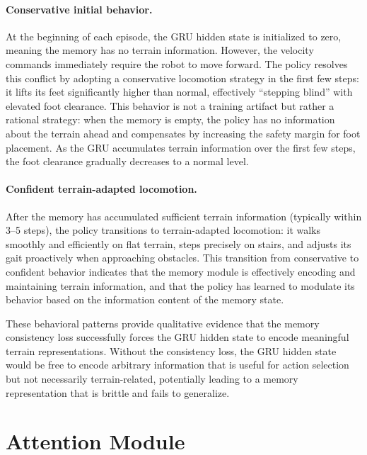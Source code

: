 \paragraph{Conservative initial behavior.}
At the beginning of each episode, the GRU hidden state is initialized to zero, meaning the memory has no terrain information. However, the velocity commands immediately require the robot to move forward. The policy resolves this conflict by adopting a conservative locomotion strategy in the first few steps: it lifts its feet significantly higher than normal, effectively ``stepping blind'' with elevated foot clearance. This behavior is not a training artifact but rather a rational strategy: when the memory is empty, the policy has no information about the terrain ahead and compensates by increasing the safety margin for foot placement. As the GRU accumulates terrain information over the first few steps, the foot clearance gradually decreases to a normal level.

\paragraph{Confident terrain-adapted locomotion.}
After the memory has accumulated sufficient terrain information (typically within 3--5 steps), the policy transitions to terrain-adapted locomotion: it walks smoothly and efficiently on flat terrain, steps precisely on stairs, and adjusts its gait proactively when approaching obstacles. This transition from conservative to confident behavior indicates that the memory module is effectively encoding and maintaining terrain information, and that the policy has learned to modulate its behavior based on the information content of the memory state.

These behavioral patterns provide qualitative evidence that the memory consistency loss successfully forces the GRU hidden state to encode meaningful terrain representations. Without the consistency loss, the GRU hidden state would be free to encode arbitrary information that is useful for action selection but not necessarily terrain-related, potentially leading to a memory representation that is brittle and fails to generalize.

\section{Attention Module}
\label{sec:attention_module}


